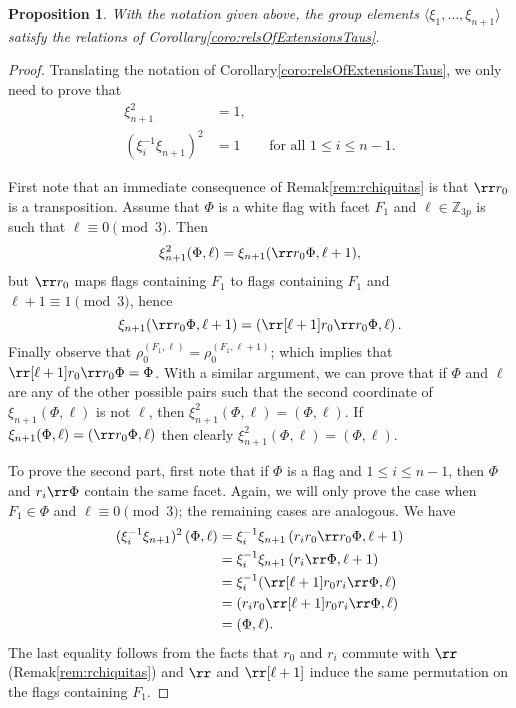 \documentclass[final]{amsart}
\theoremstyle{plain}
\newtheorem{prop}[thm]{Proposition}
\theoremstyle{definition}
\theoremstyle{remark}
\numberwithin{equation}{section}
\renewcommand{\leq}{\leqslant} \renewcommand{\geq}{\geqslant}
\renewcommand{\{}{\lbrace}
\renewcommand{\}}{\rbrace}
\newcommand{\bZ}{\mathbb{Z}}
\newcommand{\te}{\xi}
\begin{document}
\begin{prop} \label{prop:chiralExtRelations}
 With the notation given above, the group elements $\langle \te_{1}, \dots, \te_{n+1} \rangle$ satisfy the relations of Corollary\nobreakspace \ref {coro:relsOfExtensionsTaus}.
\end{prop}
\begin{proof}
 Translating the notation of Corollary\nobreakspace \ref {coro:relsOfExtensionsTaus}, we only need to prove that
 \[\begin{aligned}
  \te_{n+1}^{2} &= 1, && \\
 (\te_{i}^{-1} \te_{n+1})^{2} &= 1  &&\text{for all } 1 \leq i \leq n-1.
\end{aligned}\]

First note that an immediate consequence of Remak\nobreakspace \ref {rem:rchiquitas} is that $\rr r_{0}$ is a transposition.
Assume that $\Phi$ is a white flag with facet $F_{1}$ and $\ell \in \bZ_{3p}$ is such that $\ell \equiv 0 \pmod{3}$.
Then \[\te_{n+1}^{2}(\Phi, \ell) = \te_{n+1}(\rr r_{0} \Phi, \ell+1),\] but $\rr r_{0}$ maps flags containing $F_{1}$ to flags containing $F_{1}$ and $\ell+1 \equiv 1 \pmod{3}$, hence \[\te_{n+1}(\rr r_{0} \Phi, \ell+1) = \left( \rr[\ell +1] r_{0} \rr r_{0} \Phi, \ell\right).\]
Finally observe that $\rho_{0}^{(F_{1},\ell)} = \rho_{0}^{(F_{1},\ell+1)}$; which implies that $\rr[\ell +1] r_{0} \rr r_{0} \Phi = \Phi$.
With a similar argument, we can prove that if $\Phi$ and $\ell$ are any of the other possible pairs such that the second coordinate of $\te_{n+1}(\Phi,\ell)$ is not $\ell$, then $\te_{n+1}^2 (\Phi,\ell) = \left( \Phi, \ell \right)$.
If $\te_{n+1}(\Phi,\ell) = (\rr r_0 \Phi,\ell)$ then clearly $\te^{2}_{n+1}(\Phi,\ell) = (\Phi,\ell)$.

To prove the second part, first note that if $\Phi$ is a flag and $1 \leq i \leq n-1$, then $\Phi$ and $r_{i} \rr \Phi$ contain the same facet. 
Again, we will only prove the case when $F_{1} \in \Phi$ and $\ell \equiv 0 \pmod{3}$; the remaining cases are analogous. We have
\begin{align*}
 (\te_{i}^{-1} \te_{n+1})^{2}\left(\Phi, \ell\right) &= \te_{i}^{-1} \te_{n+1} \left(r_{i}r_{0} \rr r_{0}\Phi, \ell+1\right)  \\
 &=  \te_{i}^{-1} \te_{n+1} \left(r_{i}\rr \Phi, \ell+1\right) \\
 &= \te_{i}^{-1}(\rr[\ell + 1] r_{0} r_{i} \rr \Phi, \ell) \\
 &= (r_{i} r_{0} \rr[\ell + 1] r_{0} r_{i} \rr \Phi, \ell) \\
 &= (\Phi, \ell).
\end{align*}
The last equality follows from the facts that $r_{0}$ and $r_{i}$ commute with $\rr$ (Remak\nobreakspace \ref {rem:rchiquitas}) and $\rr$ and $\rr[\ell+1]$ induce the same permutation on the flags containing $F_{1}$.
\end{proof}
\end{document}
